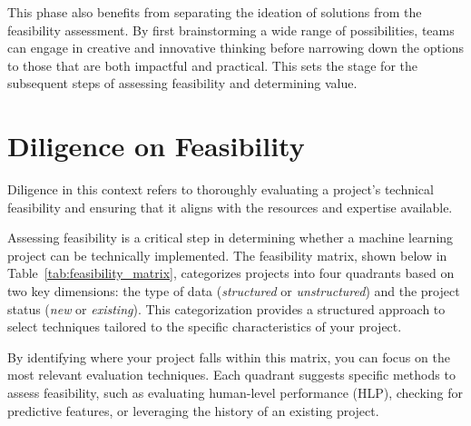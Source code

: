 \documentclass[12pt,openany, draft]{book}
\begin{document}
This phase also benefits from separating the ideation of solutions from the feasibility assessment. By first brainstorming a wide range of possibilities, teams can engage in creative and innovative thinking before narrowing down the options to those that are both impactful and practical. This sets the stage for the subsequent steps of assessing feasibility and determining value.


\section{Diligence on Feasibility}

Diligence in this context refers to thoroughly evaluating a project's technical feasibility and ensuring that it aligns with the resources and expertise available.

Assessing feasibility is a critical step in determining whether a machine learning project can be technically implemented. The feasibility matrix, shown below in Table~\ref{tab:feasibility_matrix}, categorizes projects into four quadrants based on two key dimensions: the type of data (\textit{structured} or \textit{unstructured}) and the project status (\textit{new} or \textit{existing}). This categorization provides a structured approach to select techniques tailored to the specific characteristics of your project.


\begin{table}[htbp]
\centering
\caption{The feasibility matrix categorizes projects based on data type (structured or unstructured) and project status (new or existing) to guide the selection of techniques for assessing feasibility.}
\label{tab:feasibility_matrix}
\end{table}

By identifying where your project falls within this matrix, you can focus on the most relevant evaluation techniques. Each quadrant suggests specific methods to assess feasibility, such as evaluating human-level performance (HLP), checking for predictive features, or leveraging the history of an existing project. 
\end{document}
